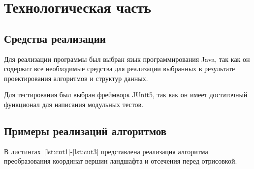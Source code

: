 \chapter{Технологическая часть}

\section{Средства реализации}

Для реализации программы был выбран язык программирования Java, так как он содержит все необходимые средства для реализации выбранных в результате проектирования алгоритмов и структур данных. 

Для тестирования был выбран фреймворк JUnit5, так как он имеет достаточный функционал для написания модульных тестов.

\section{Примеры реализаций алгоритмов}

В листингах~\ref{lst:cut1}-\ref{lst:cut3} представлена реализация алгоритма преобразования координат вершин ландшафта и отсечения перед отрисовкой.

